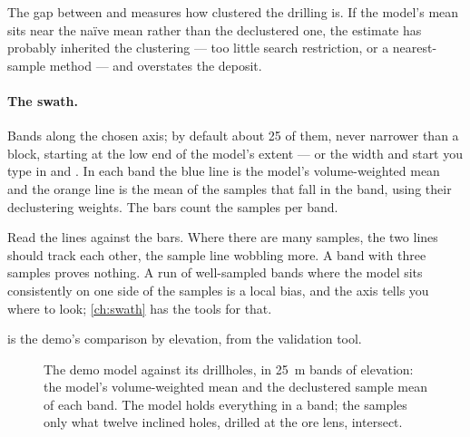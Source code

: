 The gap between  and  measures how clustered the drilling is. If the model's mean sits near the naïve mean rather than the declustered one, the estimate has probably inherited the clustering — too little search restriction, or a nearest-sample method — and overstates the deposit.

\paragraph{The swath.} Bands along the chosen axis; by default about 25 of them, never narrower than a block, starting at the low end of the model's extent — or the width and start you type in  and . In each band the blue line is the model's volume-weighted mean and the orange line is the mean of the samples that fall in the band, using their declustering weights. The bars count the samples per band.

Read the lines against the bars. Where there are many samples, the two lines should track each other, the sample line wobbling more. A band with three samples proves nothing. A run of well-sampled bands where the model sits consistently on one side of the samples is a local bias, and the axis tells you where to look; \cref{ch:swath} has the tools for that.

 is the demo's comparison by elevation, from the validation tool.

\begin{figure}[htbp]\centering
{}
\caption{The demo model against its drillholes, in 25~m bands of elevation: the model's volume-weighted mean  and the declustered sample mean of each band. The model holds everything in a band; the samples only what twelve inclined holes, drilled at the ore lens, intersect.}\label{fig:validation-demo}
\end{figure}

